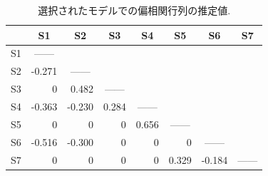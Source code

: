 \documentclass[11pt,dvipdfmx]{jarticle}
\theoremstyle{definition}
\begin{document}
\begin{table}[htbp]
    \caption{選択されたモデルでの偏相関行列の推定値. }
    \label{table:par-final}
    \begin{center}{\small
            \begin{tabular}{|c|rrrrrrr|}
                \hline
                & \multicolumn{1}{c}{S1}     & \multicolumn{1}{c}{S2}     & \multicolumn{1}{c}{S3}     & \multicolumn{1}{c}{S4}     & \multicolumn{1}{c}{S5}     & \multicolumn{1}{c}{S6}     & \multicolumn{1}{c|}{S7}     \\ \hline
                S1 & \multicolumn{1}{c}{------} &                            &                            &                            &                            &                            &                             \\
                S2 & -0.271                     & \multicolumn{1}{c}{------} &                            &                            &                            &                            &                             \\
                S3 &  0                      & 0.482                      & \multicolumn{1}{c}{------} &                            &                            &                            &                             \\
                S4 & -0.363                     & -0.230                     & 0.284                      & \multicolumn{1}{c}{------} &                            &                            &                             \\
                S5 & 0                    &  0                    &  0                      & 0.656                      & \multicolumn{1}{c}{------} &                            &                             \\
                S6 & -0.516                     & -0.300                     &  0                     &  0                    &  0                     & \multicolumn{1}{c}{------} &                             \\
                S7 &  0                     &  0                      &  0               & 0                   & 0.329                      & -0.184                     & \multicolumn{1}{c|}{------} \\ \hline
        \end{tabular}}
    \end{center}
\end{table}
\end{document}
